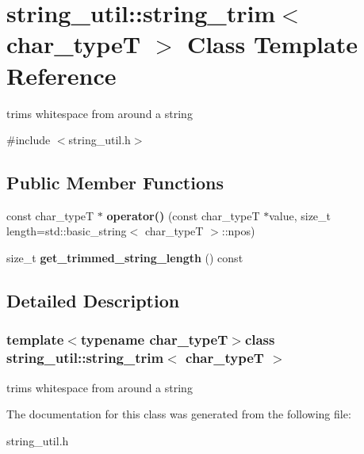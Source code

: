 \hypertarget{classstring__util_1_1string__trim}{\section{string\+\_\+util\+:\+:string\+\_\+trim$<$ char\+\_\+type\+T $>$ Class Template Reference}
\label{classstring__util_1_1string__trim}
}


trims whitespace from around a string  




{\ttfamily \#include $<$string\+\_\+util.\+h$>$}

\subsection*{Public Member Functions}
\begin{DoxyCompactItemize}
\item 
\hypertarget{classstring__util_1_1string__trim_a33ce709a5bd7a1fd2d974a0940fc1ff8}{const char\+\_\+type\+T $\ast$ {\bfseries operator()} (const char\+\_\+type\+T $\ast$value, size\+\_\+t length=std\+::basic\+\_\+string$<$ char\+\_\+type\+T $>$\+::npos)}\label{classstring__util_1_1string__trim_a33ce709a5bd7a1fd2d974a0940fc1ff8}

\item 
\hypertarget{classstring__util_1_1string__trim_abea837c5d6ef343a91b161d039162ecb}{size\+\_\+t {\bfseries get\+\_\+trimmed\+\_\+string\+\_\+length} () const }\label{classstring__util_1_1string__trim_abea837c5d6ef343a91b161d039162ecb}

\end{DoxyCompactItemize}


\subsection{Detailed Description}
\subsubsection*{template$<$typename char\+\_\+type\+T$>$class string\+\_\+util\+::string\+\_\+trim$<$ char\+\_\+type\+T $>$}

trims whitespace from around a string 

The documentation for this class was generated from the following file\+:\begin{DoxyCompactItemize}
\item 
string\+\_\+util.\+h\end{DoxyCompactItemize}
